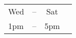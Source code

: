  \begin{center}
   \begin{tabular}{lrcl}
     \hline
     Wed & -- & Sat \\
     1pm & -- & 5pm \\
     \hline
   \end{tabular}
 \end{center}
